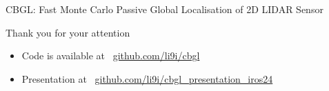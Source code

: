 \begin{frame}[noframenumbering]{CBGL: Fast Monte Carlo Passive Global Localisation of 2D LIDAR Sensor}

\begin{center}
  Thank you for your attention
\end{center}

  \vspace{1cm}

  \begin{itemize}
    \item \scriptsize Code is available at \ \url{github.com/li9i/cbgl}
    \item \scriptsize Presentation at \ \url{github.com/li9i/cbgl\_presentation\_iros24}
  \end{itemize}

\end{frame}
